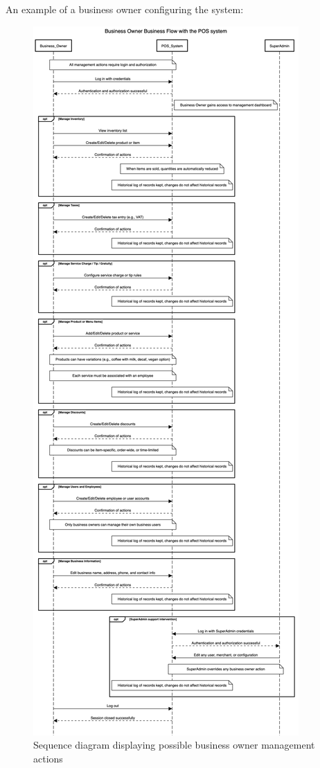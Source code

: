 \documentclass[11pt,a4paper,pdftex]{article}
\begin{document}
An example of a business owner configuring the system:

\begin{figure}[H]
    \centering
    \includegraphics[scale=0.22]{graphics/business owner.png}
    \caption{Sequence diagram displaying possible business owner management actions}
    \label{figures:sequence_business_owner}
\end{figure}
\end{document}
